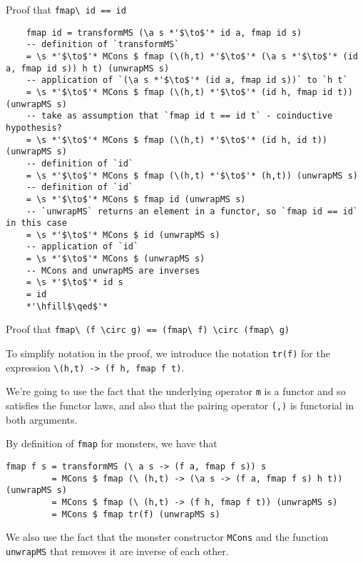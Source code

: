 \documentclass{article}
\begin{document}
Proof that \verb+fmap\ id == id+

\begin{lstlisting}
	fmap id = transformMS (\a s *'$\to$'* id a, fmap id s)
	-- definition of `transformMS`
	= \s *'$\to$'* MCons $ fmap (\(h,t) *'$\to$'* (\a s *'$\to$'* (id a, fmap id s)) h t) (unwrapMS s)
	-- application of `(\a s *'$\to$'* (id a, fmap id s))` to `h t`
	= \s *'$\to$'* MCons $ fmap (\(h,t) *'$\to$'* (id h, fmap id t)) (unwrapMS s)
	-- take as assumption that `fmap id t == id t` - coinductive hypothesis?
	= \s *'$\to$'* MCons $ fmap (\(h,t) *'$\to$'* (id h, id t)) (unwrapMS s)
	-- definition of `id`
	= \s *'$\to$'* MCons $ fmap (\(h,t) *'$\to$'* (h,t)) (unwrapMS s)
	-- definition of `id`
	= \s *'$\to$'* MCons $ fmap id (unwrapMS s)
	-- `unwrapMS` returns an element in a functor, so `fmap id == id` in this case
	= \s *'$\to$'* MCons $ id (unwrapMS s)
	-- application of `id`
	= \s *'$\to$'* MCons $ (unwrapMS s)
	-- MCons and unwrapMS are inverses
	= \s *'$\to$'* id s 
	= id
	*'\hfill$\qed$'*
\end{lstlisting}

Proof that \verb+fmap\ (f \circ g) == (fmap\ f) \circ (fmap\ g)+

To simplify notation in the proof, we introduce the notation \verb+tr(f)+ for the expression \verb+\(h,t) -> (f h, fmap f t)+.

We're going to use the fact that the underlying operator \verb+m+ is a functor and so satisfies the functor laws, and also that the pairing operator \verb+(,)+ is functorial in both arguments.

By definition of \verb+fmap+ for monsters, we have that
\begin{lstlisting}
fmap f s = transformMS (\ a s -> (f a, fmap f s)) s
         = MCons $ fmap (\ (h,t) -> (\a s -> (f a, fmap f s) h t)) (unwrapMS s)
         = MCons $ fmap (\ (h,t) -> (f h, fmap f t)) (unwrapMS s)
         = MCons $ fmap tr(f) (unwrapMS s)
\end{lstlisting}

We also use the fact that the monster constructor \verb+MCons+ and the function \verb+unwrapMS+ that removes it are inverse of each other.
\end{document}
